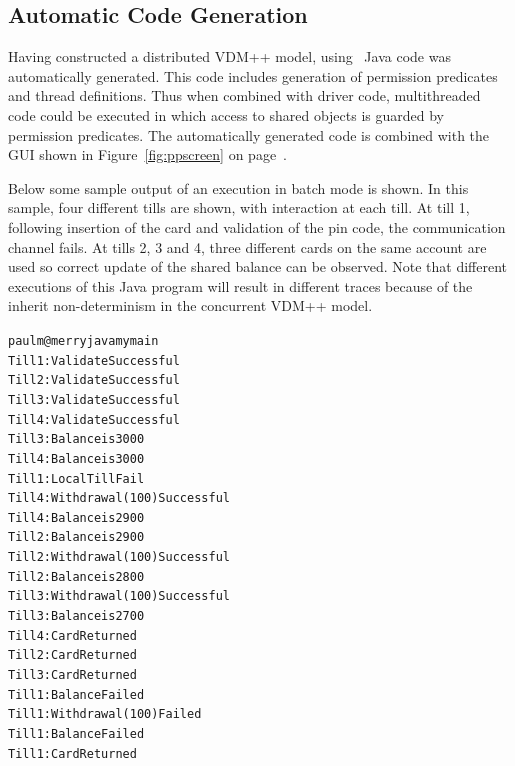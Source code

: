 \documentclass[\pformat,12pt,twoside]{article}
\begin{document}
\subsection{Automatic Code Generation}

Having constructed a distributed VDM++ model, using \vdmtools\  
Java code was automatically generated. This code includes generation 
of permission predicates and thread definitions. Thus when combined 
with driver code, multithreaded code could be executed in which 
access to shared objects is guarded by permission predicates. The
automatically generated code is combined with the GUI shown in
Figure~\ref{fig:ppscreen} on page~\pageref{fig:ppscreen}. 

Below some sample output of an execution in batch mode is shown.
In this sample, four different tills are shown, with interaction 
at each till. At till 1, following insertion of the card and 
validation of the pin code, the communication channel fails. 
At tills 2, 3 and 4, three different cards on the same account 
are used so correct update of the shared balance can be observed.
Note that different executions of this Java program will result in
different traces because of the inherit non-determinism in the
concurrent VDM++ model.

\begin{alltt}
paulm@merry java mymain
Till 1: Validate Successful
Till 2: Validate Successful
Till 3: Validate Successful
Till 4: Validate Successful
Till 3: Balance is 3000
Till 4: Balance is 3000
Till 1: LocalTill Fail
Till 4: Withdrawal (100) Successful
Till 4: Balance is 2900
Till 2: Balance is 2900
Till 2: Withdrawal (100) Successful
Till 2: Balance is 2800
Till 3: Withdrawal (100) Successful
Till 3: Balance is 2700
Till 4: Card Returned
Till 2: Card Returned
Till 3: Card Returned
Till 1: Balance Failed
Till 1: Withdrawal (100) Failed
Till 1: Balance Failed
Till 1: Card Returned
\end{alltt}
\end{document}
